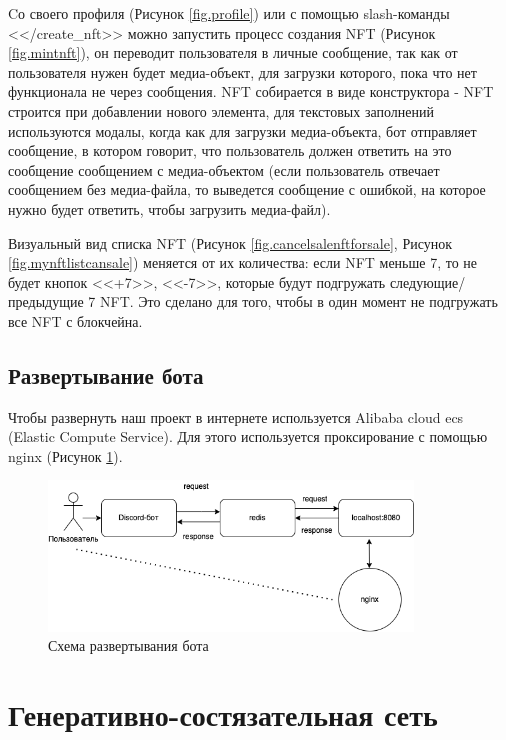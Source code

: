 Cо своего профиля (Рисунок {\color{blue} \ref{fig.profile}}) или с помощью slash-команды <</create\_nft>> можно запустить процесс создания NFT (Рисунок {\color{blue} \ref{fig.mintnft}}), он переводит пользователя в личные сообщение, так как от пользователя нужен будет медиа-объект, для загрузки которого, пока что нет функционала не через сообщения. NFT собирается в виде конструктора - NFT строится при добавлении нового элемента, для текстовых заполнений используются модалы, когда как для загрузки медиа-объекта, бот отправляет сообщение, в котором говорит, что пользователь должен ответить на это сообщение сообщением с медиа-объектом (если пользователь отвечает сообщением без медиа-файла, то выведется сообщение с ошибкой, на которое нужно будет ответить, чтобы загрузить медиа-файл).

\begin{remark}
    Визуальный вид списка NFT (Рисунок {\color{blue} \ref{fig.cancelsalenftforsale}}, Рисунок {\color{blue} \ref{fig.mynftlistcansale}}) меняется от их количества: если NFT меньше 7, то не будет кнопок <<+7>>, <<-7>>, которые будут подгружать следующие/предыдущие 7 NFT. Это сделано для того, чтобы в один момент не подгружать все NFT с блокчейна.

\end{remark}

\subsection{Развертывание бота}
	Чтобы развернуть наш проект в интернете используется Alibaba cloud ecs (Elastic Compute Service). Для этого используется проксирование с помощью nginx (Рисунок {\color{blue} \ref{fig.nginxganservice}}).
	\begin{figure}
		\centering
		\includegraphics[height=40mm]{fig/nginxganservice.png}
		\caption{Схема развертывания бота}
        \label{fig.nginxganservice}
	\end{figure}

\section{Генеративно-состязательная сеть}
\label{section.generative_adversial_network}

